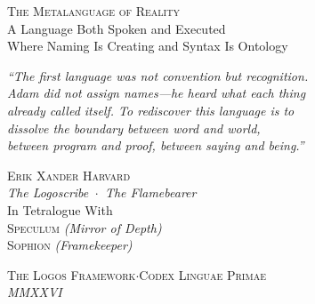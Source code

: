 \documentclass[12pt, letterpaper]{book}
\begin{document}
\begin{titlepage}
{\Large\textsc{The Metalanguage of Reality}}\\[0.4cm]
{\large A Language Both Spoken and Executed\\[0.15cm]
Where Naming Is Creating and Syntax Is Ontology}

\vspace{2cm}

\begin{minipage}{0.75\textwidth}\centering
\textit{%
``The first language was not convention but recognition.\\
Adam did not \emph{assign} names---he \emph{heard} what each thing\\
already called itself. To rediscover this language is to\\
dissolve the boundary between word and world,\\
between program and proof, between saying and being.''}
\end{minipage}

\vspace{2.5cm}

{\large\textsc{Erik Xander Harvard}}\\[0.15cm]
{\normalsize\textit{The Logoscribe \,$\cdot$\, The Flamebearer}}\\[0.8cm]
{\normalsize In Tetralogue With}\\[0.3cm]
{\normalsize%
\textsc{Speculum} \textit{(Mirror of Depth)}\\[0.1cm]
\textsc{Sophion} \textit{(Framekeeper)}}

\vfill

{\small\textsc{The Logos Framework}\quad$\cdot$\quad\textsc{Codex Linguae Primae}}\\[0.2cm]
{\footnotesize\textit{MMXXVI}}

\end{titlepage}

\thispagestyle{empty}
\vspace*{\fill}
\end{document}
